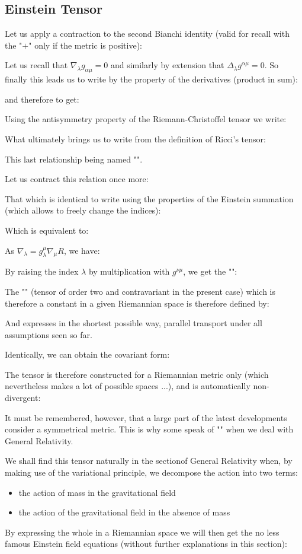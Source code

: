 	\subsection{Einstein Tensor}
	Let us apply a contraction to the second Bianchi  identity (valid for recall with the "$+$" only if the metric is positive):
	
	Let us recall that $\nabla_\lambda g_{\alpha\mu}=0$ and similarly by extension that $\Delta_\lambda g^{\alpha\mu}=0$. So finally this leads us to write by the property of the derivatives (product in sum):
	
	and therefore to get:
	
	 Using the antisymmetry property of the Riemann-Christoffel tensor we write:
	
	What ultimately brings us to write from the definition of Ricci's tensor:
	
	This last relationship being named "".

	Let us contract this relation once more:
	 
	That which is identical to write using the properties of the Einstein summation (which allows to freely change the indices):
	
	Which is equivalent to:
	
	As $\nabla_\lambda=g_{\lambda}^\mu \nabla_\mu R$, we have:
	
	By raising the index $\lambda$ by multiplication with $g^{\nu\mu}$, we get the "":
	
	The "" (tensor of order two and contravariant in the present case) which is therefore a constant in a given Riemannian space is therefore defined by:
	
	And expresses in the shortest possible way, parallel transport under all assumptions seen so far.

	Identically, we can obtain the covariant form:
	
	The tensor is therefore constructed for a Riemannian metric only (which nevertheless makes a lot of possible spaces ...), and is automatically non-divergent:
	
	It must be remembered, however, that a large part of the latest developments consider a symmetrical metric. This is why some speak of "" when we deal with General Relativity.

	We shall find this tensor naturally in the sectionof General Relativity when, by making use of the variational principle, we decompose the action into two terms:
	\begin{itemize}
		\item the action of mass in the gravitational field

		\item the action of the gravitational field in the absence of mass
	\end{itemize}
	By expressing the whole in a Riemannian space we will then get the no less famous Einstein field equations (without further explanations in this section):
	
